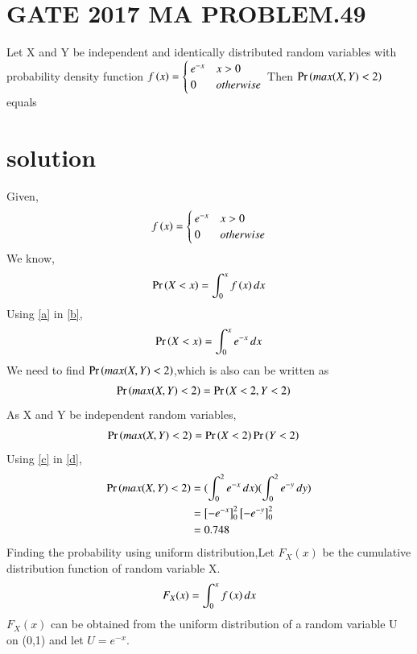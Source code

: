 \documentclass[journal,12pt,twocolumn]{IEEEtran}
\begin{document}
\section{GATE 2017 MA PROBLEM.49}
Let X and Y be independent and identically distributed random variables with probability density function
$f\left(x\right)= \begin{cases}
       e^{-x}  & x>0\\
        0 & otherwise\\
    \end{cases}$
  Then $\Pr\left(max(X,Y)<2\right)$ equals  
  \section{solution}
Given,
\begin{align}
f\left(x\right) = 
    \begin{cases}
       e^{-x}  & x>0\\
        0 & otherwise\\
   \end{cases} \label{a}
\end{align}
We know,
\begin{align}
\Pr\left(X<x\right) = \int_{0}^{x}{f\left(x\right)}\,dx \label{b}
\end{align}
Using \eqref{a} in \eqref{b},
\begin{align}
\Pr\left(X<x\right) = \int_{0}^{x}{e^{-x}}\,dx \label{c}
\end{align}
We need to find $\Pr\left( max(X,Y)<2\right)$,which is also can be written as
\begin{align}
   \Pr\left(max(X,Y)<2\right) &=\Pr\left(X<2 ,Y<2\right)
\end{align}
As X and Y be independent random variables,
\begin{align}
   \Pr\left(max(X,Y)<2\right) &=\Pr\left(X<2\right)\Pr\left(Y<2\right) \label{d}
\end{align}
Using \eqref{c} in \eqref{d},
\begin{align}
   \Pr\left(max(X,Y)<2\right) &= (\int_{0}^{2}{e^{-x}}\,dx)(\int_{0}^{2}{e^{-y}}\,dy)\\
   &= \left[-e^{-x}\right]_0^2 \left[-e^{-y}\right]_0^2\\
   &=0.748
\end{align}
Finding the probability using uniform distribution,Let $F_X(x)$ be the cumulative distribution function of random variable X.
\begin{align}
F_X(x) =\int_{0}^{x}{f\left(x\right)}\,dx
\end{align}
$F_X(x)$ can be obtained from the uniform distribution of a random variable U on (0,1) and let $U=e^{-x}$.
\end{document}
